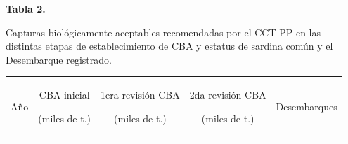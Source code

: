 \documentclass[
  spanish,
]{article}
\begin{document}
\pagebreak

\small
\begin{center} 
\textbf{Tabla 2.}
\end{center}
\begin{center} 
\vspace{-0.2cm} Capturas biológicamente aceptables recomendadas por el CCT-PP en 
las distintas etapas de establecimiento de CBA y estatus de sardina común y el Desembarque registrado.
\end{center}
\vspace{-0.2cm}

\begin{longtable}[]{@{}ccccc@{}}
\toprule
\begin{minipage}[b]{0.08\columnwidth}\centering
Año\strut
\end{minipage} & \begin{minipage}[b]{0.18\columnwidth}\centering
CBA inicial

(miles de t.)\strut
\end{minipage} & \begin{minipage}[b]{0.22\columnwidth}\centering
1era revisión CBA

(miles de t.)\strut
\end{minipage} & \begin{minipage}[b]{0.21\columnwidth}\centering
2da revisión CBA

(miles de t.)\strut
\end{minipage} & \begin{minipage}[b]{0.18\columnwidth}\centering
Desembarques


\end{minipage}
\end{longtable}
\end{document}
